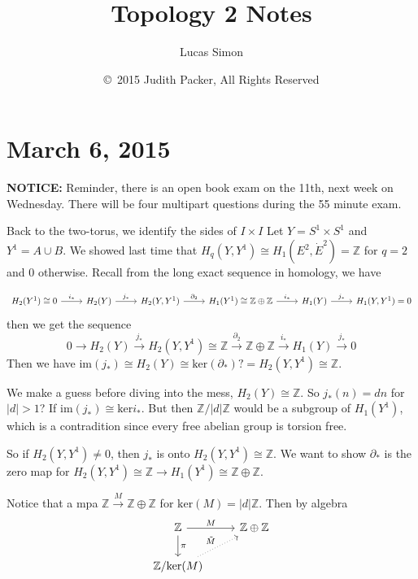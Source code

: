 \documentclass{article}
\title{Topology 2 Notes}
\author{Lucas Simon}
\date{\copyright\ 2015 Judith Packer, All Rights Reserved}
\begin{document}
\maketitle

\section{March 6, 2015}

\textbf{NOTICE:} Reminder, there is an open book exam on the 11th, next week on Wednesday. There will be four multipart questions during the 55 minute exam.

Back to the two-torus, we identify the sides of $I \times I$
Let $Y = S^1 \times S^1$ and $Y^1 = A \cup B$. We showed last time that $H_q(Y, Y^1) \cong H_1(E^2, \dot{E}^2) = \mathbb{Z}$ for $q = 2$ and $0$ otherwise.
Recall from the long exact sequence in homology, we have

\[
\begin{tikzcd}
H_2(Y^1) \cong 0 \arrow[r, "i_*"] & H_2(Y) \arrow[r, "j_*"] & H_2(Y, Y^1) \arrow[r, "\partial_2"] & H_1(Y^1) \cong \mathbb{Z} \oplus \mathbb{Z} \arrow[r, "i_*"] & H_1(Y) \arrow[r, "j_*"] & H_1(Y, Y^1) = 0
\end{tikzcd}
\]
then we get the sequence
\[
0 \to H_2(Y) \xrightarrow{j_*} H_2(Y, Y^1) \cong \mathbb{Z} \xrightarrow{\partial_2} \mathbb{Z} \oplus \mathbb{Z} \xrightarrow{i_*} H_1(Y) \xrightarrow{j_*} 0
\]
Then we have $\text{im}(j_*) \cong H_2(Y) \cong \text{ker}(\partial_*) ? = H_2(Y, Y^1) \cong \mathbb{Z}$.

We make a guess before diving into the mess, $H_2(Y) \cong \mathbb{Z}$. So $j_*(n) = dn$ for $|d| > 1$? If $\text{im}(j_*) \cong \text{ker}{i_*}$. But then $\mathbb{Z}/ |d|\mathbb{Z}$ would be a subgroup of $H_1(Y^1)$, which is a contradition since every free abelian group is torsion free.

So if $H_2(Y, Y^1) \neq 0$, then $j_*$ is onto $H_2(Y, Y^1) \cong \mathbb{Z}$. We want to show $\partial_*$ is the zero map for $H_2(Y, Y^1) \cong \mathbb{Z} \to H_1(Y^1) \cong \mathbb{Z} \oplus \mathbb{Z}$.

Notice that a mpa $\mathbb{Z} \xrightarrow{M} \mathbb{Z} \oplus \mathbb{Z}$ for $\text{ker}(M) = |d|\mathbb{Z}$. Then by algebra
\[
\begin{tikzcd}
\mathbb{Z} \arrow[d, "\pi"] \arrow[r, "M"] & \mathbb{Z} \oplus \mathbb{Z} \\
\mathbb{Z}/ \text{ker}(M) \arrow[ur, dotted, "\tilde{M}"]
\end{tikzcd}
\]
\end{document}
